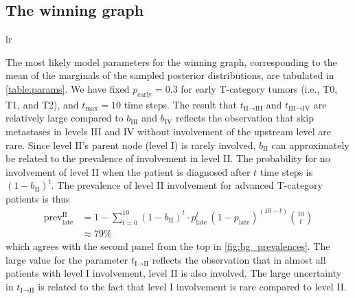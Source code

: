 \documentclass[twocolumn]{aastex631}
\begin{document}
\subsection{The winning graph}
\label{subsec:results:optimal_graph}

\begin{deluxetable}{lr}
    \startdata
    \enddata
\end{deluxetable}

The most likely model parameters for the winning graph, corresponding to the mean of the marginals of the sampled posterior distributions, are tabulated in \autoref{table:params}. We have fixed $p_\text{early}=0.3$ for early T-category tumors (i.e., T0, T1, and T2), and $t_\text{max}=10$ time steps. The result that $t_{\text{II} \rightarrow \text{III}}$ and $t_{\text{III} \rightarrow \text{IV}}$ are relatively large compared to $b_\text{III}$ and $b_\text{IV}$ reflects the observation that skip metastases in levels III and IV without involvement of the upstream level are rare. Since level II's parent node (level I) is rarely involved, $b_\text{II}$ can approximately be related to the prevalence of involvement in level II. The probability for no involvement of level II when the patient is diagnosed after $t$ time steps is $\left(1-b_\text{II}\right)^t$. The prevalence of level II involvement for advanced T-category patients is thus
%
\begin{equation}
    \begin{aligned}
        \text{prev}_\text{late}^\text{II} &= 1-\sum_{t=0}^{10} \left(1-b_\text{II}\right)^t \cdot p_\text{late}^t \, (1-p_\text{late})^{(10-t)}\binom{10}{t} \\
        &\approx 79 \%
    \end{aligned}
\end{equation}
%
which agrees with the second panel from the top in \autoref{fig:bg_prevalences}. 
The large value for the parameter $t_{\text{I} \rightarrow \text{II}}$ reflects the observation that in almost all patients with level I involvement, level II is also involved. The large uncertainty in $t_{\text{I} \rightarrow \text{II}}$ is related to the fact that level I involvement is rare compared to level II.
\end{document}
